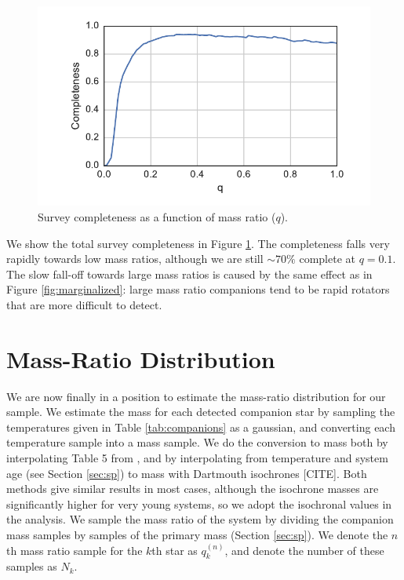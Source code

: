 \documentclass{emulateapj}
\begin{document}
\begin{figure}
\includegraphics[width=\columnwidth]{SurveyCompleteness.pdf}
\caption{Survey completeness as a function of mass ratio ($q$).}
\label{fig:completeness}
\end{figure}

We show the total survey completeness in Figure \ref{fig:completeness}. The completeness falls very rapidly towards low mass ratios, although we are still $\sim 70\%$ complete at $q = 0.1$. The slow fall-off towards large mass ratios is caused by the same effect as in Figure \ref{fig:marginalized}: large mass ratio companions tend to be rapid rotators that are more difficult to detect.

\section{Mass-Ratio Distribution}
\label{sec:mrd}

We are now finally in a position to estimate the mass-ratio distribution for our sample. We estimate the mass for each detected companion star by sampling the temperatures given in Table \ref{tab:companions} as a gaussian, and converting each temperature sample into a mass sample. We do the conversion to mass both by interpolating Table 5 from \citet{Pecaut2013}, and by interpolating from temperature and system age (see Section \ref{sec:sp}) to mass with Dartmouth isochrones [CITE]. Both methods give similar results in most cases, although the isochrone masses are significantly higher for very young systems, so we adopt the isochronal values in the analysis. We sample the mass ratio of the system by dividing the companion mass samples by samples of the primary mass (Section \ref{sec:sp}). We denote the $n$th mass ratio sample for the $k$th star as $q_k^{(n)}$, and denote the number of these samples as $N_k$.
\end{document}
